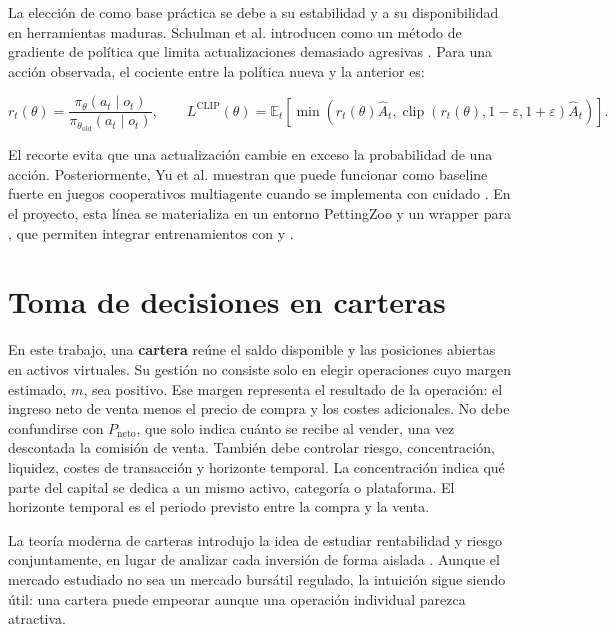 La elección de  como base práctica se debe a su estabilidad y a su disponibilidad en herramientas maduras. Schulman et al. introducen  como un método de gradiente de política que limita actualizaciones demasiado agresivas \cite{schulman2017ppo}. Para una acción observada, el cociente entre la política nueva y la anterior es:

\[
r_t(\theta)=\frac{\pi_\theta(a_t\mid o_t)}{\pi_{\theta_{\mathrm{old}}}(a_t\mid o_t)},
\qquad
L^{\mathrm{CLIP}}(\theta)=
\mathbb{E}_t\!\left[
\min\!\left(r_t(\theta)\widehat{A}_t,
\operatorname{clip}(r_t(\theta),1-\varepsilon,1+\varepsilon)\widehat{A}_t\right)
\right].
\]

El recorte evita que una actualización cambie en exceso la probabilidad de una acción. Posteriormente, Yu et al. muestran que  puede funcionar como baseline fuerte en juegos cooperativos multiagente cuando se implementa con cuidado \cite{yu2022mappo}. En el proyecto, esta línea se materializa en un entorno PettingZoo y un wrapper para , que permiten integrar entrenamientos con  y .


\section{Toma de decisiones en carteras}

En este trabajo, una \textbf{cartera} reúne el saldo disponible y las posiciones abiertas en activos virtuales. Su gestión no consiste solo en elegir operaciones cuyo margen estimado, $m$, sea positivo. Ese margen representa el resultado de la operación: el ingreso neto de venta menos el precio de compra y los costes adicionales. No debe confundirse con $P_{\mathrm{neto}}$, que solo indica cuánto se recibe al vender, una vez descontada la comisión de venta. También debe controlar riesgo, concentración, liquidez, costes de transacción y horizonte temporal. La concentración indica qué parte del capital se dedica a un mismo activo, categoría o plataforma. El horizonte temporal es el periodo previsto entre la compra y la venta.

La teoría moderna de carteras introdujo la idea de estudiar rentabilidad y riesgo conjuntamente, en lugar de analizar cada inversión de forma aislada \cite{markowitz1952portfolio}. Aunque el mercado estudiado no sea un mercado bursátil regulado, la intuición sigue siendo útil: una cartera puede empeorar aunque una operación individual parezca atractiva.

